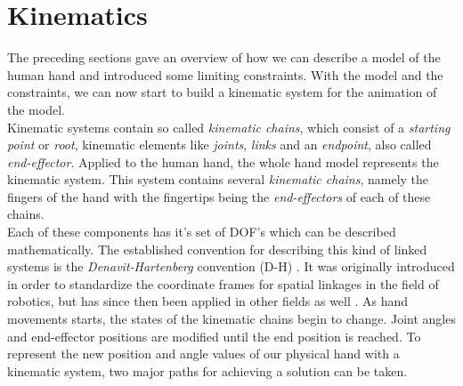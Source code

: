 \section{Kinematics}
\label{sec:kinematics}
The preceding sections gave an overview of how we can describe a model of the human hand and introduced some limiting constraints. With the model and the constraints, we can now start to build a kinematic system for the animation of the model.\\
Kinematic systems contain so called \textit{kinematic chains}, which consist of a \textit{starting point} or \textit{root}, kinematic elements like \textit{joints}, \textit{links} and an \textit{endpoint}, also called \textit{end-effector}. Applied to the human hand, the whole hand model represents the kinematic system. This system contains several \textit{kinematic chains}, namely the fingers of the hand with the fingertips being the \textit{end-effectors} of each of these chains.
\\Each of these components has it's set of DOF's which can be described mathematically. The established convention for describing this kind of linked systems is the \textit{Denavit-Hartenberg} convention (D-H) \cite{Denavit.1955}. It was originally introduced in order to standardize the coordinate frames for spatial linkages in the field of robotics, but has since then been applied in other fields as well \cite{Spong.2008}. As hand movements starts, the states of the kinematic chains begin to change. Joint angles and end-effector positions are modified until the end position is reached. To represent the new position and angle values of our physical hand with a kinematic system, two major paths for achieving a solution can be taken.
